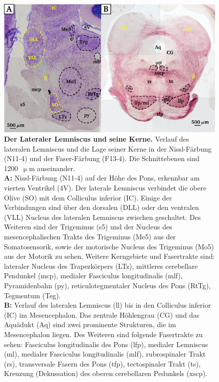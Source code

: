 \begin{figure}[H]
    \centering
    \includegraphics[width = \textwidth]{pictures/auditory/lateral_lemniscus.png}
    \caption[Der Lateraler Lemniscus und seine Kerne]{\textbf{Der Lateraler Lemniscus und seine Kerne.} Verlauf des lateralen Lemniscus und die Lage seiner Kerne in der Nissl-Färbung (N11-4) und der Faser-Färbung (F13-4). Die Schnittebenen sind 1200~$\upmu$m auseinander.\\
    \textbf{A:} Nissl-Färbung (N11-4) auf der Höhe des Pons, erkennbar am vierten Ventrikel (4V).
    Der laterale Lemniscus verbindet die obere Olive (SO) mit dem Colliculus inferior (IC). Einige der Verbindungen sind über den dorsalen (DLL) oder den ventralen (VLL) Nucleus des lateralen Lemniscus zwischen geschaltet. 
    Des Weiteren sind der Trigeminus (s5) und der Nucleus des mesencephalischen Trakts des Trigeminus (Me5) aus der Somatosensorik, sowie der motorische Nucleus des Trigeminus (Mo5) aus der Motorik zu sehen. 
    Weitere Kerngebiete und Fasertrakte sind: lateraler Nucleus des Trapezkörpers (LTz), mittleres cerebellare Pendunkel (mcp), medialer Fasciculus longitudinalis (mlf), Pyramidenbahn (py), reticulotegmentaler Nucleus des Pons (RtTg), Tegmentum (Teg).\\
    \textbf{B:} Verlauf des lateralen Lemniscus (ll) bis in den Colliculus inferior (IC) im Mesencephalon. Das zentrale Höhlengrau (CG) und das Aquädukt (Aq) sind zwei prominente Strukturen, die im Mesencephalon liegen. Des Weiteren sind folgende Fasertrakte zu sehen: Fasciculus longitudinalis des Pons (lfp), medialer Lemniscus (ml), medialer Fasciculus longitudinalis (mlf), rubrospinaler Trakt (rs), transversale Fasern des Pons (tfp), tectospinaler Trakt (ts), Kreuzung (Dekussation) des oberen cerebellaren Pedunkels (xscp).}
    \label{fig:lateraler_lemniscus}
\end{figure}

